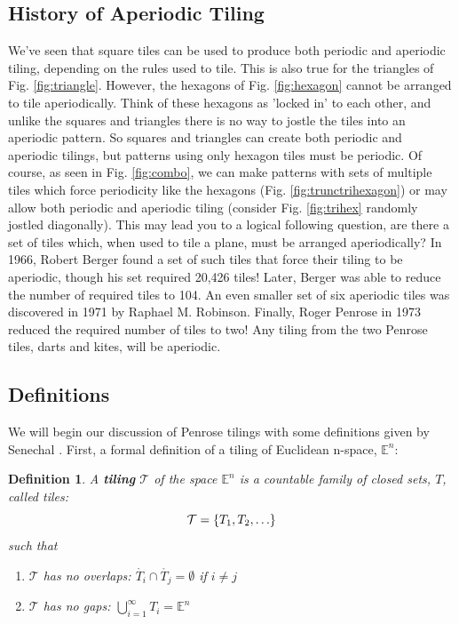 \documentclass[]{article}
\newtheorem{mydef}{Definition}
\begin{document}
\subsection{History of Aperiodic Tiling}
We've seen that square tiles can be used to produce both periodic and aperiodic tiling, depending on the rules used to tile. This is also true for the triangles of Fig. \ref{fig:triangle}. However, the hexagons of Fig. \ref{fig:hexagon} cannot be arranged to tile aperiodically. Think of these hexagons as 'locked in' to each other, and unlike the squares and triangles there is no way to jostle the tiles into an aperiodic pattern. So squares and triangles can create both periodic and aperiodic tilings, but patterns using only hexagon tiles must be periodic. Of course, as seen in Fig. \ref{fig:combo}, we can make patterns with sets of multiple tiles which force periodicity like the hexagons (Fig. \ref{fig:trunctrihexagon}) or may allow both periodic and aperiodic tiling (consider Fig. \ref{fig:trihex} randomly jostled diagonally). This may lead you to a logical following question, are there a set of tiles which, when used to tile a plane, must be arranged aperiodically? In 1966, Robert Berger found a set of such tiles that force their tiling to be aperiodic, though his set required 20,426 tiles! Later, Berger was able to reduce the number of required tiles to 104. An even smaller set of six aperiodic tiles was discovered in 1971 by Raphael M. Robinson. Finally, Roger Penrose in 1973 reduced the required number of tiles to two! Any tiling from the two Penrose tiles, darts and kites, will be aperiodic.



\subsection{Definitions}
We will begin our discussion of Penrose tilings with some definitions given by Senechal \cite{Senechal1996}. First, a formal definition of a tiling of Euclidean n-space, $\mathbb{E}^n$:



\begin{mydef}
A \textbf{tiling} $\mathcal{T}$ of the space $\mathbb{E}^n$ is a countable family of closed sets, $T$, called tiles:
\begin{equation*}
\mathcal{T}=\{T_1,T_2,\mathellipsis\}
\end{equation*}
such that
\begin{enumerate}
\item $\mathcal{T}$ has no overlaps: $\mathring{T_i} \cap \mathring{T_j}=\emptyset$ if $i\neq j$
\item $\mathcal{T}$ has no gaps: $\bigcup_{i=1}^\infty T_i = \mathbb{E}^n$
\end{enumerate}
\end{mydef}
\end{document}
